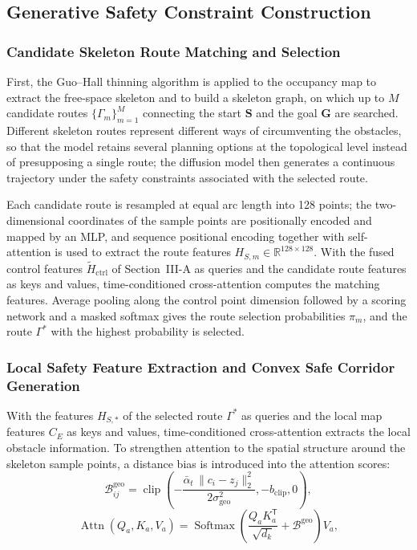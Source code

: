 \documentclass[journal]{IEEEtran}
\newcommand{\R}{\mathbb{R}}
\newcommand{\ctrlf}{\widetilde{H}_{\mathrm{ctrl}}}
\newcommand{\abar}{\bar{\alpha}}
\begin{document}
\subsection{Generative Safety Constraint Construction}

\subsubsection{Candidate Skeleton Route Matching and Selection}
First, the Guo--Hall thinning algorithm is applied to the occupancy map to
extract the free-space skeleton and to build a skeleton graph, on which up to
$M$ candidate routes $\{\Gamma_m\}_{m=1}^{M}$ connecting the start $\bm S$ and
the goal $\bm G$ are searched. Different skeleton routes represent different
ways of circumventing the obstacles, so that the model retains several planning
options at the topological level instead of presupposing a single route; the
diffusion model then generates a continuous trajectory under the safety
constraints associated with the selected route.

Each candidate route is resampled at equal arc length into 128 points; the
two-dimensional coordinates of the sample points are positionally encoded and
mapped by an MLP, and sequence positional encoding together with self-attention
is used to extract the route features $H_{S,m}\in\R^{128\times128}$. With the
fused control features $\ctrlf$ of Section~III-A as queries and the candidate
route features as keys and values, time-conditioned cross-attention computes
the matching features. Average pooling along the control point dimension
followed by a scoring network and a masked softmax gives the route selection
probabilities $\pi_m$, and the route $\Gamma^*$ with the highest probability is
selected.

\subsubsection{Local Safety Feature Extraction and Convex Safe Corridor Generation}
With the features $H_{S,*}$ of the selected route $\Gamma^*$ as queries and the
local map features $C_E$ as keys and values, time-conditioned cross-attention
extracts the local obstacle information. To strengthen attention to the spatial
structure around the skeleton sample points, a distance bias is introduced into
the attention scores:
\begin{equation}
\mathcal B_{ij}^{\mathrm{geo}}
=\operatorname{clip}\!\left(
-\frac{\abar_t\,\lVert c_i-z_j\rVert_2^2}
{2\sigma_{\mathrm{geo}}^2},
-b_{\mathrm{clip}},0\right),
\end{equation}
\begin{equation}
\operatorname{Attn}(Q_a,K_a,V_a)
=\operatorname{Softmax}\!\left(
\frac{Q_aK_a^{\mathsf T}}{\sqrt{d_k}}+\mathcal B^{\mathrm{geo}}
\right)V_a,
\end{equation}
\end{document}
